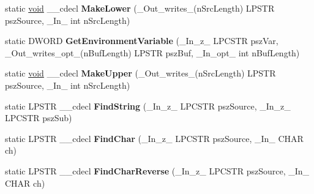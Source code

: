 \begin{DoxyCompactItemize}
\item 
\mbox{\label{class_a_t_l_1_1_ch_traits_c_r_t_3_01char_01_4_a624f45a6dad0b5825a8bf84cd10d0565}} 
static \hyperlink{interfacevoid}{void} \+\_\+\+\_\+cdecl {\bfseries Make\+Lower} (\+\_\+\+Out\+\_\+writes\+\_\+(n\+Src\+Length) L\+P\+S\+TR psz\+Source, \+\_\+\+In\+\_\+ int n\+Src\+Length)
\item 
\mbox{\label{class_a_t_l_1_1_ch_traits_c_r_t_3_01char_01_4_a5bf604274fbbfc3b4665c852bad3ab6e}} 
static D\+W\+O\+RD {\bfseries Get\+Environment\+Variable} (\+\_\+\+In\+\_\+z\+\_\+ L\+P\+C\+S\+TR psz\+Var, \+\_\+\+Out\+\_\+writes\+\_\+opt\+\_\+(n\+Buf\+Length) L\+P\+S\+TR psz\+Buf, \+\_\+\+In\+\_\+opt\+\_\+ int n\+Buf\+Length)
\item 
\mbox{\label{class_a_t_l_1_1_ch_traits_c_r_t_3_01char_01_4_ad9ed0f83f801ab5eb1d312d1e41dbbf1}} 
static \hyperlink{interfacevoid}{void} \+\_\+\+\_\+cdecl {\bfseries Make\+Upper} (\+\_\+\+Out\+\_\+writes\+\_\+(n\+Src\+Length) L\+P\+S\+TR psz\+Source, \+\_\+\+In\+\_\+ int n\+Src\+Length)
\item 
\mbox{\label{class_a_t_l_1_1_ch_traits_c_r_t_3_01char_01_4_a56bbb6db898f02ac1f5203c80db54484}} 
static L\+P\+S\+TR \+\_\+\+\_\+cdecl {\bfseries Find\+String} (\+\_\+\+In\+\_\+z\+\_\+ L\+P\+C\+S\+TR psz\+Source, \+\_\+\+In\+\_\+z\+\_\+ L\+P\+C\+S\+TR psz\+Sub)
\item 
\mbox{\label{class_a_t_l_1_1_ch_traits_c_r_t_3_01char_01_4_a7d27ace0d591db409599238b8f202775}} 
static L\+P\+S\+TR \+\_\+\+\_\+cdecl {\bfseries Find\+Char} (\+\_\+\+In\+\_\+z\+\_\+ L\+P\+C\+S\+TR psz\+Source, \+\_\+\+In\+\_\+ C\+H\+AR ch)
\item 
\mbox{\label{class_a_t_l_1_1_ch_traits_c_r_t_3_01char_01_4_ae95472bf589265c79d4678638059f0e8}} 
static L\+P\+S\+TR \+\_\+\+\_\+cdecl {\bfseries Find\+Char\+Reverse} (\+\_\+\+In\+\_\+z\+\_\+ L\+P\+C\+S\+TR psz\+Source, \+\_\+\+In\+\_\+ C\+H\+AR ch)
\item 
\mbox{\label{class_a_t_l_1_1_ch_traits_c_r_t_3_01char_01_4_adb3b25f3ff652c2827c3092e3403cbd8}} 

\end{DoxyCompactItemize}
